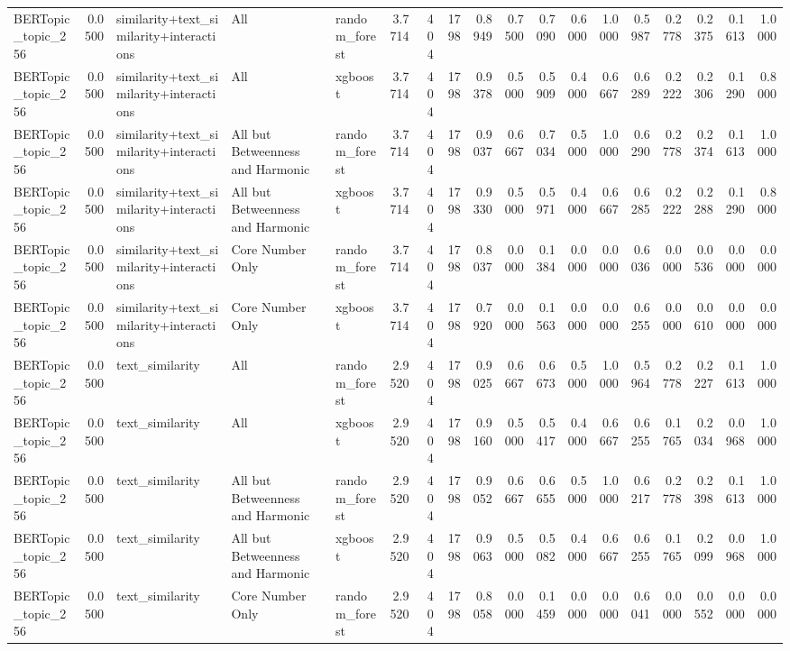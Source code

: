 \begin{tabular}{lrlllrrrrrrrrrrrrr}
BERTopic_topic_256 & 0.0500 & similarity+text_similarity+interactions & All & random_forest & 3.7714 & 404 & 1798 & 0.8949 & 0.7500 & 0.7090 & 0.6000 & 1.0000 & 0.5987 & 0.2778 & 0.2375 & 0.1613 & 1.0000 \\
BERTopic_topic_256 & 0.0500 & similarity+text_similarity+interactions & All & xgboost & 3.7714 & 404 & 1798 & 0.9378 & 0.5000 & 0.5909 & 0.4000 & 0.6667 & 0.6289 & 0.2222 & 0.2306 & 0.1290 & 0.8000 \\
BERTopic_topic_256 & 0.0500 & similarity+text_similarity+interactions & All but Betweenness and Harmonic & random_forest & 3.7714 & 404 & 1798 & 0.9037 & 0.6667 & 0.7034 & 0.5000 & 1.0000 & 0.6290 & 0.2778 & 0.2374 & 0.1613 & 1.0000 \\
BERTopic_topic_256 & 0.0500 & similarity+text_similarity+interactions & All but Betweenness and Harmonic & xgboost & 3.7714 & 404 & 1798 & 0.9330 & 0.5000 & 0.5971 & 0.4000 & 0.6667 & 0.6285 & 0.2222 & 0.2288 & 0.1290 & 0.8000 \\
BERTopic_topic_256 & 0.0500 & similarity+text_similarity+interactions & Core Number Only & random_forest & 3.7714 & 404 & 1798 & 0.8037 & 0.0000 & 0.1384 & 0.0000 & 0.0000 & 0.6036 & 0.0000 & 0.0536 & 0.0000 & 0.0000 \\
BERTopic_topic_256 & 0.0500 & similarity+text_similarity+interactions & Core Number Only & xgboost & 3.7714 & 404 & 1798 & 0.7920 & 0.0000 & 0.1563 & 0.0000 & 0.0000 & 0.6255 & 0.0000 & 0.0610 & 0.0000 & 0.0000 \\
BERTopic_topic_256 & 0.0500 & text_similarity & All & random_forest & 2.9520 & 404 & 1798 & 0.9025 & 0.6667 & 0.6673 & 0.5000 & 1.0000 & 0.5964 & 0.2778 & 0.2227 & 0.1613 & 1.0000 \\
BERTopic_topic_256 & 0.0500 & text_similarity & All & xgboost & 2.9520 & 404 & 1798 & 0.9160 & 0.5000 & 0.5417 & 0.4000 & 0.6667 & 0.6255 & 0.1765 & 0.2034 & 0.0968 & 1.0000 \\
BERTopic_topic_256 & 0.0500 & text_similarity & All but Betweenness and Harmonic & random_forest & 2.9520 & 404 & 1798 & 0.9052 & 0.6667 & 0.6655 & 0.5000 & 1.0000 & 0.6217 & 0.2778 & 0.2398 & 0.1613 & 1.0000 \\
BERTopic_topic_256 & 0.0500 & text_similarity & All but Betweenness and Harmonic & xgboost & 2.9520 & 404 & 1798 & 0.9063 & 0.5000 & 0.5082 & 0.4000 & 0.6667 & 0.6255 & 0.1765 & 0.2099 & 0.0968 & 1.0000 \\
BERTopic_topic_256 & 0.0500 & text_similarity & Core Number Only & random_forest & 2.9520 & 404 & 1798 & 0.8058 & 0.0000 & 0.1459 & 0.0000 & 0.0000 & 0.6041 & 0.0000 & 0.0552 & 0.0000 & 0.0000 \\

\end{tabular}
